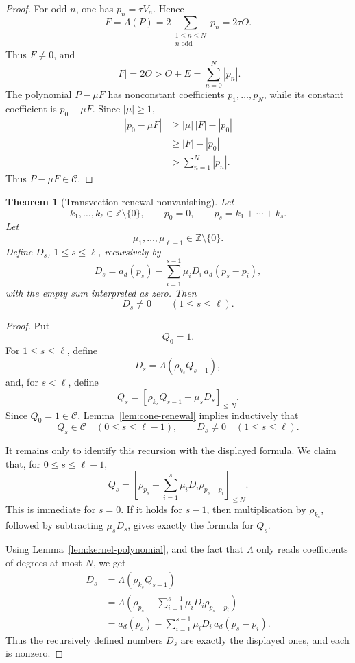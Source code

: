 \documentclass[a4paper,11pt]{amsart}
\newtheorem{theorem}{Theorem}[section]
\theoremstyle{remark}
\newcommand{\Z}{\mathbb Z}
\numberwithin{equation}{section}
\begin{document}
\begin{proof}
For odd \(n\), one has \(p_n=\tau V_n\).  Hence
\[
        F=\Lambda(P)
        =
        2\sum_{\substack{1\le n\le N\\ n\text{ odd}}}p_n
        =
        2\tau O.
\]
Thus \(F\ne0\), and
\[
        |F|=2O>O+E=\sum_{n=0}^{N}|p_n|.
\]
The polynomial \(P-\mu F\) has nonconstant coefficients \(p_1,\ldots,p_N\), while its constant coefficient is \(p_0-\mu F\).  Since \(|\mu|\ge1\),
\[
\begin{aligned}
        |p_0-\mu F|
        &\ge
        |\mu|\,|F|-|p_0|  \\
        &\ge
        |F|-|p_0|         \\
        &>
        \sum_{n=1}^{N}|p_n|.
\end{aligned}
\]
Thus \(P-\mu F\in\mathcal C\).
\end{proof}

\begin{theorem}[Transvection renewal nonvanishing]\label{thm:renewal}
Let
\[
        k_1,\ldots,k_\ell\in\Z\setminus\{0\},
        \qquad
        p_0=0,
        \qquad
        p_s=k_1+\cdots+k_s.
\]
Let
\[
        \mu_1,\ldots,\mu_{\ell-1}\in\Z\setminus\{0\}.
\]
Define \(D_s\), \(1\le s\le\ell\), recursively by
\[
        D_s
        =
        a_d(p_s)
        -
        \sum_{i=1}^{s-1}\mu_iD_i\,a_d(p_s-p_i),
\]
with the empty sum interpreted as zero.  Then
\[
        D_s\ne0
        \qquad(1\le s\le\ell).
\]
\end{theorem}

\begin{proof}
Put
\[
        Q_0=1.
\]
For \(1\le s\le\ell\), define
\[
        D_s=\Lambda(\rho_{k_s}Q_{s-1}),
\]
and, for \(s<\ell\), define
\[
        Q_s=[\rho_{k_s}Q_{s-1}-\mu_sD_s]_{\le N}.
\]
Since \(Q_0=1\in\mathcal C\), Lemma~\ref{lem:cone-renewal} implies inductively that
\[
        Q_s\in\mathcal C
        \quad(0\le s\le\ell-1),
        \qquad
        D_s\ne0
        \quad(1\le s\le\ell).
\]

It remains only to identify this recursion with the displayed formula.  We claim that, for \(0\le s\le\ell-1\),
\[
        Q_s
        =
        \left[
        \rho_{p_s}
        -
        \sum_{i=1}^{s}\mu_iD_i\rho_{p_s-p_i}
        \right]_{\le N}.
\]
This is immediate for \(s=0\).  If it holds for \(s-1\), then multiplication by \(\rho_{k_s}\), followed by subtracting \(\mu_sD_s\), gives exactly the formula for \(Q_s\).

Using Lemma~\ref{lem:kernel-polynomial}, and the fact that \(\Lambda\) only reads coefficients of degrees at most \(N\), we get
\[
\begin{aligned}
        D_s
        &=
        \Lambda(\rho_{k_s}Q_{s-1})                                      \\
        &=
        \Lambda\left(
        \rho_{p_s}
        -
        \sum_{i=1}^{s-1}\mu_iD_i\rho_{p_s-p_i}
        \right)                                                         \\
        &=
        a_d(p_s)
        -
        \sum_{i=1}^{s-1}\mu_iD_i\,a_d(p_s-p_i).
\end{aligned}
\]
Thus the recursively defined numbers \(D_s\) are exactly the displayed ones, and each is nonzero.
\end{proof}
\end{document}

